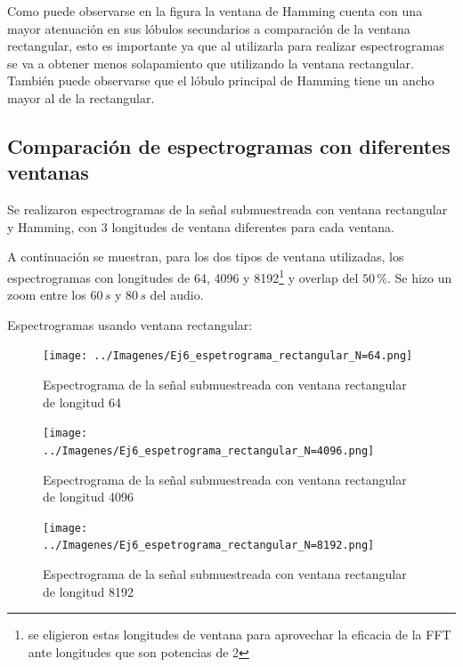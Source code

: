 \documentclass[10pt,spanish,a4paper,openany,notitlepage]{article}
\begin{document}
Como puede observarse en la figura la ventana de Hamming cuenta
con una mayor atenuación en sus lóbulos secundarios a comparación
de la ventana rectangular, esto es importante ya que al utilizarla
para realizar espectrogramas se va a obtener menos solapamiento que utilizando
la ventana rectangular. También puede observarse que el lóbulo principal
de Hamming tiene un ancho mayor al de la rectangular.

\subsection{Comparación de espectrogramas con diferentes ventanas}

Se realizaron espectrogramas de la señal submuestreada con ventana
rectangular y Hamming, con 3 longitudes de ventana diferentes para
cada ventana.

A continuación se muestran, para los dos tipos de ventana utilizadas,
los espectrogramas con longitudes de 64, 4096 y 8192\footnote{se eligieron 
estas longitudes de ventana para aprovechar la eficacia de la FFT ante longitudes que son potencias de 2}
y overlap del $50\,\unit{\%}$. 
Se hizo un zoom entre los $60\, \unit{s}$ y $80\, \unit{s}$ del audio.

Espectrogramas usando ventana rectangular:

\begin{figure}[H] %
\begin{center}
\texttt{[image: ../Imagenes/Ej6\_espetrograma\_rectangular\_N=64.png]}
\caption{Espectrograma de la señal submuestreada con ventana rectangular de longitud 64}
 \label{fig:rec_N=64}
\end{center}
\end{figure}

\begin{figure}[H] %
\begin{center}
\texttt{[image: ../Imagenes/Ej6\_espetrograma\_rectangular\_N=4096.png]}
\caption{Espectrograma de la señal submuestreada con ventana rectangular de longitud 4096}
 \label{fig:rec_N=4096}
\end{center}
\end{figure}

\begin{figure}[H] %
\begin{center}
\texttt{[image: ../Imagenes/Ej6\_espetrograma\_rectangular\_N=8192.png]}
\caption{Espectrograma de la señal submuestreada con ventana rectangular de longitud 8192}
 \label{fig:rec_N=8192}
\end{center}
\end{figure}
\end{document}

